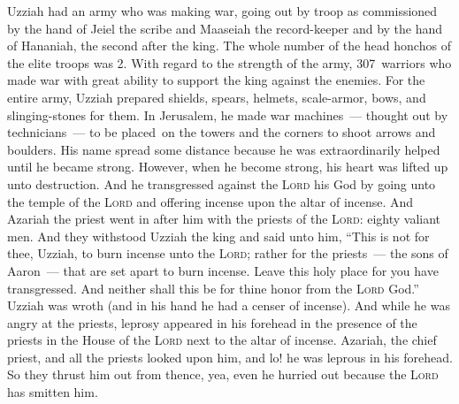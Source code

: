\begin{inparaenum}
     Uzziah had an army who was making war, going out by troop as commissioned by the hand of Jeiel the scribe and Maaseiah the record-keeper and by the hand of Hananiah, the second after the king.%
     The whole number of the head honchos of the elite troops was 2.%
     With regard to the strength of the army, 307~warriors who made war with great ability to support the king against the enemies.%
     For the entire army, Uzziah prepared shields, spears, helmets, scale-armor, bows, and slinging-stones for them.%
     In Jerusalem, he made war machines~--- thought out by technicians~--- to be placed\understood\ on the towers and the corners to shoot arrows and boulders. His name spread some distance because he was extraordinarily helped  until he became strong.%
     However, when he become strong, his heart was lifted up unto destruction. And he transgressed against the \textsc{Lord} his God by going unto the temple of the \textsc{Lord} and offering incense upon the altar of incense.%
     And Azariah the priest went in after him with the priests of the \textsc{Lord}: eighty valiant men.%
     And they withstood Uzziah the king and said unto him, ``This is not for thee, Uzziah, to burn incense unto the \textsc{Lord}; rather for the priests~--- the sons of Aaron~--- that are set apart to burn incense. Leave this holy place for you have transgressed. And neither shall this be for thine honor from the \textsc{Lord} God.''%
     Uzziah was wroth (and in his hand he had a censer of incense). And while he was angry at the priests, leprosy appeared in his forehead in the presence of the priests in the House of the \textsc{Lord} next to the altar of incense.%
     Azariah, the chief priest, and all the priests looked upon him, and lo! he was leprous in his forehead. So they thrust him out from thence, yea, even he hurried out because the \textsc{Lord} has smitten him.%

\end{inparaenum}

